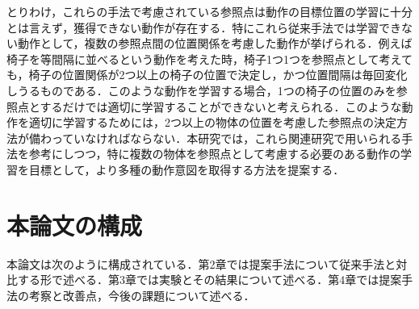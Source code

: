 とりわけ，これらの手法で考慮されている参照点は動作の目標位置の学習に十分とは言えず，獲得できない動作が存在する．特にこれら従来手法では学習できない動作として，複数の参照点間の位置関係を考慮した動作が挙げられる．例えば椅子を等間隔に並べるという動作を考えた時，椅子1つ1つを参照点として考えても，椅子の位置関係が2つ以上の椅子の位置で決定し，かつ位置間隔は毎回変化しうるものである．このような動作を学習する場合，1つの椅子の位置のみを参照点とするだけでは適切に学習することができないと考えられる．このような動作を適切に学習するためには，2つ以上の物体の位置を考慮した参照点の決定方法が備わっていなければならない．本研究では，これら関連研究で用いられる手法を参考にしつつ，特に複数の物体を参照点として考慮する必要のある動作の学習を目標として，より多種の動作意図を取得する方法を提案する．        

\section{本論文の構成}

本論文は次のように構成されている．第2章では提案手法について従来手法と対比する形で述べる．第3章では実験とその結果について述べる．第4章では提案手法の考察と改善点，今後の課題について述べる．	
